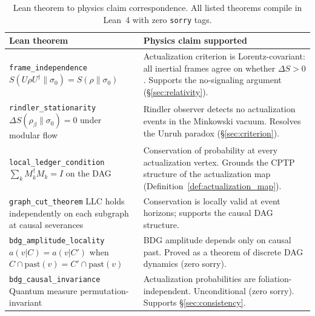 \documentclass[11pt,a4paper]{article}
\theoremstyle{plain}
\theoremstyle{definition}
\theoremstyle{remark}
\begin{document}
\begin{table}[ht]
\centering
\small
\caption{Lean theorem to physics claim correspondence.
  All listed theorems compile in Lean~4 with zero \texttt{sorry} tags.}
\label{tab:lean_map}
\begin{tabular}{p{4.5cm}p{7cm}}
\toprule
\textbf{Lean theorem} & \textbf{Physics claim supported} \\
\midrule
\texttt{frame\_independence} \newline
$S(U\rho U^\dagger\|\sigma_0) = S(\rho\|\sigma_0)$ &
Actualization criterion is Lorentz-covariant: all inertial frames agree on
whether $\Delta S > 0$. Supports the no-signaling argument
(\S\ref{sec:relativity}). \\[4pt]

\texttt{rindler\_stationarity} \newline
$\Delta S(\rho_\beta\|\sigma_0) = 0$ under modular flow &
Rindler observer detects no actualization events in the Minkowski vacuum.
Resolves the Unruh paradox (\S\ref{sec:criterion}). \\[4pt]

\texttt{local\_ledger\_condition} \newline
$\sum_k M_k^\dagger M_k = I$ on the DAG & 
Conservation of probability at every actualization vertex.
Grounds the CPTP structure of the actualization map
(Definition~\ref{def:actualization_map}). \\[4pt]

\texttt{graph\_cut\_theorem} \newline
LLC holds independently on each subgraph at causal severances &
Conservation is locally valid at event horizons; supports the
causal DAG structure. \\[4pt]

\texttt{bdg\_amplitude\_locality} \newline
$a(v|C) = a(v|C')$ when $C \cap \mathrm{past}(v) = C' \cap \mathrm{past}(v)$ &
BDG amplitude depends only on causal past. Proved as a theorem
of discrete DAG dynamics (zero sorry). \\[4pt]

\texttt{bdg\_causal\_invariance} \newline
Quantum measure permutation-invariant &
Actualization probabilities are foliation-independent. Unconditional
(zero sorry). Supports \S\ref{sec:consistency}. \\
\bottomrule
\end{tabular}
\end{table}
\end{document}
